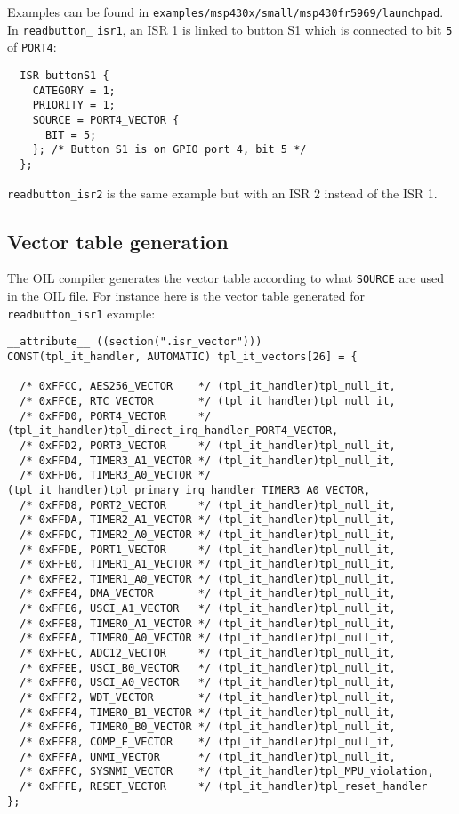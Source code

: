 \documentclass[11pt, oneside]{article}   	%
\begin{document}
Examples can be found in \lstinline[breaklines=true]{examples/msp430x/small/msp430fr5969/launchpad}. In \lstinline{readbutton_} \lstinline{isr1}, an ISR 1 is linked to button S1 which is connected to bit \lstinline{5} of \lstinline{PORT4}:

\begin{lstlisting}
  ISR buttonS1 {
    CATEGORY = 1;
    PRIORITY = 1;
    SOURCE = PORT4_VECTOR {
      BIT = 5;
    }; /* Button S1 is on GPIO port 4, bit 5 */
  };
\end{lstlisting}

\lstinline{readbutton_isr2} is the same example but with an ISR 2 instead of the ISR 1.

\subsection{Vector table generation}

The OIL compiler generates the vector table according to what \lstinline{SOURCE} are used in the OIL file. For instance here is the vector table generated for \lstinline[breaklines=true]{readbutton_isr1} example:

\begin{lstlisting}[basicstyle=\tiny\ttfamily]
__attribute__ ((section(".isr_vector")))
CONST(tpl_it_handler, AUTOMATIC) tpl_it_vectors[26] = {

  /* 0xFFCC, AES256_VECTOR    */ (tpl_it_handler)tpl_null_it,
  /* 0xFFCE, RTC_VECTOR       */ (tpl_it_handler)tpl_null_it,
  /* 0xFFD0, PORT4_VECTOR     */ (tpl_it_handler)tpl_direct_irq_handler_PORT4_VECTOR,
  /* 0xFFD2, PORT3_VECTOR     */ (tpl_it_handler)tpl_null_it,
  /* 0xFFD4, TIMER3_A1_VECTOR */ (tpl_it_handler)tpl_null_it,
  /* 0xFFD6, TIMER3_A0_VECTOR */ (tpl_it_handler)tpl_primary_irq_handler_TIMER3_A0_VECTOR,
  /* 0xFFD8, PORT2_VECTOR     */ (tpl_it_handler)tpl_null_it,
  /* 0xFFDA, TIMER2_A1_VECTOR */ (tpl_it_handler)tpl_null_it,
  /* 0xFFDC, TIMER2_A0_VECTOR */ (tpl_it_handler)tpl_null_it,
  /* 0xFFDE, PORT1_VECTOR     */ (tpl_it_handler)tpl_null_it,
  /* 0xFFE0, TIMER1_A1_VECTOR */ (tpl_it_handler)tpl_null_it,
  /* 0xFFE2, TIMER1_A0_VECTOR */ (tpl_it_handler)tpl_null_it,
  /* 0xFFE4, DMA_VECTOR       */ (tpl_it_handler)tpl_null_it,
  /* 0xFFE6, USCI_A1_VECTOR   */ (tpl_it_handler)tpl_null_it,
  /* 0xFFE8, TIMER0_A1_VECTOR */ (tpl_it_handler)tpl_null_it,
  /* 0xFFEA, TIMER0_A0_VECTOR */ (tpl_it_handler)tpl_null_it,
  /* 0xFFEC, ADC12_VECTOR     */ (tpl_it_handler)tpl_null_it,
  /* 0xFFEE, USCI_B0_VECTOR   */ (tpl_it_handler)tpl_null_it,
  /* 0xFFF0, USCI_A0_VECTOR   */ (tpl_it_handler)tpl_null_it,
  /* 0xFFF2, WDT_VECTOR       */ (tpl_it_handler)tpl_null_it,
  /* 0xFFF4, TIMER0_B1_VECTOR */ (tpl_it_handler)tpl_null_it,
  /* 0xFFF6, TIMER0_B0_VECTOR */ (tpl_it_handler)tpl_null_it,
  /* 0xFFF8, COMP_E_VECTOR    */ (tpl_it_handler)tpl_null_it,
  /* 0xFFFA, UNMI_VECTOR      */ (tpl_it_handler)tpl_null_it,
  /* 0xFFFC, SYSNMI_VECTOR    */ (tpl_it_handler)tpl_MPU_violation,
  /* 0xFFFE, RESET_VECTOR     */ (tpl_it_handler)tpl_reset_handler
};
\end{lstlisting}
\end{document}
